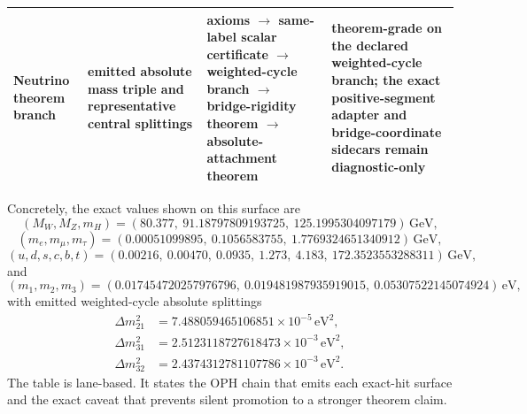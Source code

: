 \documentclass[11pt]{article}
\begin{document}
\begin{table}[h]
\begin{tabular}{@{}>{\raggedright\arraybackslash}p{}>{\raggedright\arraybackslash}p{}>{\raggedright\arraybackslash}p{}>{\raggedright\arraybackslash}p{}@{}}
Neutrino theorem branch & emitted absolute mass triple and representative central splittings & axioms \(\rightarrow\) same-label scalar certificate \(\rightarrow\) weighted-cycle branch \(\rightarrow\) bridge-rigidity theorem \(\rightarrow\) absolute-attachment theorem & theorem-grade on the declared weighted-cycle branch; the exact positive-segment adapter and bridge-coordinate sidecars remain diagnostic-only \\
\bottomrule
\end{tabular}
\end{table}

Concretely, the exact values shown on this surface are
\[
(M_W,M_Z,m_H)=
(80.377,\ 91.18797809193725,\ 125.1995304097179)\,\mathrm{GeV},
\]
\[
(m_e,m_\mu,m_\tau)=
(0.00051099895,\ 0.1056583755,\ 1.7769324651340912)\,\mathrm{GeV},
\]
\[
(u,d,s,c,b,t)=
(0.00216,\ 0.00470,\ 0.0935,\ 1.273,\ 4.183,\ 172.3523553288311)\,\mathrm{GeV},
\]
and
\[
(m_1,m_2,m_3)=
(0.017454720257976796,\ 0.019481987935919015,\ 0.05307522145074924)\,\mathrm{eV},
\]
with emitted weighted-cycle absolute splittings
\[
\begin{aligned}
\Delta m_{21}^2&=7.488059465106851\times10^{-5}\,\mathrm{eV}^2,\\
\Delta m_{31}^2&=2.5123118727618473\times10^{-3}\,\mathrm{eV}^2,\\
\Delta m_{32}^2&=2.4374312781107786\times10^{-3}\,\mathrm{eV}^2.
\end{aligned}
\]
The table is lane-based. It states the OPH chain that emits each exact-hit surface and the exact caveat that prevents silent promotion to a stronger theorem claim.
\end{document}
